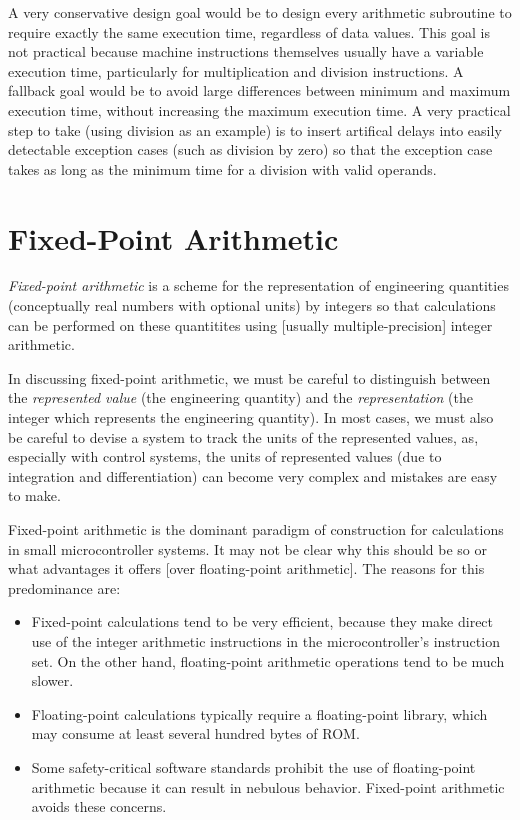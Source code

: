 A very conservative design goal would be to design every arithmetic subroutine
to require exactly the same execution time, regardless of data values.
This goal is not practical because machine instructions themselves
usually have a variable execution time, particularly for multiplication
and division instructions.  A fallback goal would be to avoid
large differences between minimum and maximum execution time, without
increasing the maximum execution time.  A very practical step to take
(using division as an example) 
is to insert artifical delays into easily detectable exception cases (such as
division by zero) so that the exception case takes as long as the 
minimum time for a division with valid operands.


\section{Fixed-Point Arithmetic}
\label{ccil0:sfpa0}

\emph{Fixed-point arithmetic} 
is a scheme for the representation
of engineering quantities (conceptually real numbers with optional
units) by integers so that calculations can be performed
on these quantitites using [usually multiple-precision]
integer arithmetic.

In discussing fixed-point arithmetic,
we must be careful to distinguish between the 
\emph{represented value} (the engineering quantity)
and the \emph{representation} (the integer which represents 
the engineering quantity).  In most cases, we must also
be careful to devise a system to track the units of the 
represented values, as, especially with control systems,
the units of represented values (due to integration and 
differentiation) can become very complex
and mistakes are easy to make.

Fixed-point arithmetic is the dominant paradigm of construction
for calculations in small microcontroller systems.  It may not be
clear why this should be so or what advantages it offers [over
floating-point arithmetic].  The reasons for
this predominance are:

\begin{itemize}
\item Fixed-point calculations tend to be very efficient, because
      they make direct use of the integer arithmetic instructions in the
      microcontroller's instruction set.  On the other hand, floating-point
      arithmetic operations tend to be much slower.

\item Floating-point calculations typically require a floating-point
      library, which may consume at least several hundred bytes
      of ROM.

\item Some safety-critical software standards prohibit the use of 
      floating-point arithmetic because it can result in nebulous
      behavior.  Fixed-point arithmetic avoids these concerns.
\end{itemize}

